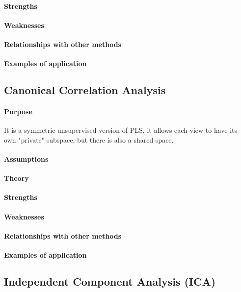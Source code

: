 \paragraph{Strengths}
\paragraph{Weaknesses}
\paragraph{Relationships with other methods}
\paragraph{Examples of application}

\subsection{Canonical Correlation Analysis}
\paragraph{Purpose}
It is a symmetric unsupervised version of PLS, it allows each view to have its own 
"private" subspace, but there is also a shared space.
\paragraph{Assumptions}
\paragraph{Theory}
\paragraph{Strengths}
\paragraph{Weaknesses}
\paragraph{Relationships with other methods}
\paragraph{Examples of application}

\subsection{Independent Component Analysis (ICA)}
